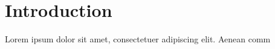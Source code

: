 \section{Introduction}
\par Lorem ipsum dolor sit amet, consectetuer adipiscing elit. Aenean comm


